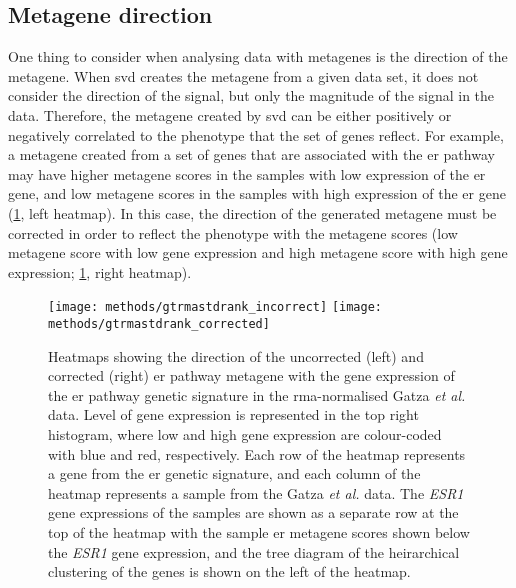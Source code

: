 \subsection{Metagene direction}
\label{sub:metagene_direction}

One thing to consider when analysing data with metagenes is the direction of the metagene.
When \gls{svd} creates the metagene from a given data set, it does not consider the direction of the signal, but only the magnitude of the signal in the data.
Therefore, the metagene created by \gls{svd} can be either positively or negatively correlated to the phenotype that the set of genes reflect.
For example, a metagene created from a set of genes that are associated with the \gls{er} pathway may have higher metagene scores in the samples with low expression of the \gls{er} gene, and low metagene scores in the samples with high expression of the \gls{er} gene (\cref{fig:methods/meta_dir}, left heatmap).
In this case, the direction of the generated metagene must be corrected in order to reflect the phenotype with the metagene scores (low metagene score with low gene expression and high metagene score with high gene expression; \cref{fig:methods/meta_dir}, right heatmap).

\begin{figure}[htpb]
	\centering
	\texttt{[image: methods/gtrmastdrank\_incorrect]}
	\hfill
	\texttt{[image: methods/gtrmastdrank\_corrected]}
	\caption[Example heatmaps showing the direction of the uncorrected and corrected \acrshort{er} pathway metagene with the gene expression of the \acrshort{er} pathway genetic signature in the \acrshort{rma}-normalised Gatza \textit{et al.} data.]{Heatmaps showing the direction of the uncorrected (left) and corrected (right) \gls{er} pathway metagene with the gene expression of the \gls{er} pathway genetic signature in the \gls{rma}-normalised Gatza \textit{et al.} data.
	Level of gene expression is represented in the top right histogram, where low and high gene expression are colour-coded with blue and red, respectively.
	Each row of the heatmap represents a gene from the \gls{er} genetic signature, and each column of the heatmap represents a sample from the Gatza \textit{et al.} data.
	The \textit{ESR1} gene expressions of the samples are shown as a separate row at the top of the heatmap with the sample \gls{er} metagene scores shown below the \textit{ESR1} gene expression, and the tree diagram of the heirarchical clustering of the genes is shown on the left of the heatmap.
	}
	\label{fig:methods/meta_dir}
\end{figure}

